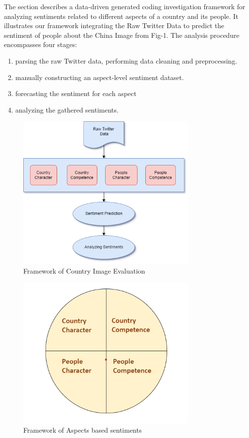 \documentclass[conference]{IEEEtran}
\begin{document}
 
The section describes a data-driven generated coding investigation framework for analyzing sentiments related to different aspects of a country and its people. It illustrates our framework integrating the Raw Twitter Data to predict the sentiment of people about the China Image from Fig-1. The analysis procedure encompasses four stages: 
\begin{enumerate}
\item parsing the raw Twitter data, performing data cleaning and preprocessing.
\item manually constructing an aspect-level sentiment dataset.
\item forecasting the sentiment for each aspect \item analyzing the gathered sentiments.\\
\end{enumerate}

\begin{figure}[h]
\centering
 \includegraphics[width=9cm]{FlowChart}
 \caption{Framework of Country Image Evaluation}
 \end{figure}
 
\begin{figure}[h]
\centering
 \includegraphics[width=9cm]{PieChartAspects}
 \caption{Framework of Aspects based sentiments}
 \end{figure}
\end{document}
